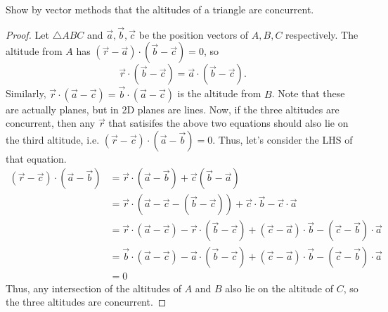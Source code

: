 \documentclass[12pt]{article}
\begin{document}
    \begin{question}
        Show by vector methods that the altitudes of a triangle are concurrent.
    \end{question}
    \begin{proof}
        Let $\triangle ABC$ and $\vec{a},\vec{b},\vec{c}$ be the
        position vectors of $A,B,C$ respectively.
        The altitude from $A$ has $(\vec{r} - \vec{a}) \cdot (\vec{b} - \vec{c}) = 0$,
        so
        \[
        \vec{r} \cdot (\vec{b} - \vec{c}) = \vec{a} \cdot (\vec{b} - \vec{c}).
        \]
        Similarly, $\vec{r}\cdot(\vec{a}-\vec{c}) = \vec{b}\cdot(\vec{a}-\vec{c})$ is
        the altitude from $B$.
        Note that these are actually planes, but in 2D planes are lines.
        Now, if the three altitudes are concurrent,
        then any $\vec{r}$ that satisifes the above two equations should
        also lie on the third altitude, i.e. $(\vec{r} - \vec{c}) \cdot (\vec{a} - \vec{b}) = 0$.
        Thus, let's consider the LHS of that equation.
        \begin{align*}
            (\vec{r}-\vec{c})\cdot(\vec{a}-\vec{b})
            &= \vec{r}\cdot(\vec{a}-\vec{b}) + \vec{c}(\vec{b}-\vec{a})\\
            &= \vec{r}\cdot(\vec{a}-\vec{c}-(\vec{b}-\vec{c}))+\vec{c}\cdot\vec{b}-\vec{c}\cdot\vec{a}\\
            &= \vec{r}\cdot(\vec{a}-\vec{c})-\vec{r}\cdot(\vec{b}-\vec{c})
            +(\vec{c}-\vec{a})\cdot\vec{b}-(\vec{c}-\vec{b})\cdot\vec{a}\\
            &= \vec{b}\cdot(\vec{a}-\vec{c})-\vec{a}\cdot(\vec{b}-\vec{c})
            +(\vec{c}-\vec{a})\cdot\vec{b}-(\vec{c}-\vec{b})\cdot\vec{a}\\
            &= 0
        \end{align*}
        Thus, any intersection of the altitudes of $A$ and $B$ also lie
        on the altitude of $C$, so the three altitudes are concurrent.
    \end{proof}
\end{document}
